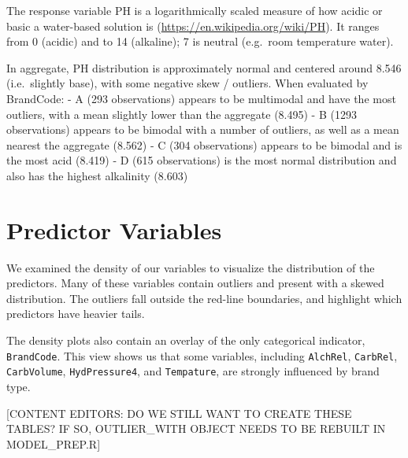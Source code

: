 \documentclass[]{report}
\begin{document}
The response variable PH is a logarithmically scaled measure of how
acidic or basic a water-based solution is
(\url{https://en.wikipedia.org/wiki/PH}). It ranges from 0 (acidic) and
to 14 (alkaline); 7 is neutral (e.g.~room temperature water).

In aggregate, PH distribution is approximately normal and centered
around 8.546 (i.e.~slightly base), with some negative skew / outliers.
When evaluated by BrandCode: - A (293 observations) appears to be
multimodal and have the most outliers, with a mean slightly lower than
the aggregate (8.495) - B (1293 observations) appears to be bimodal with
a number of outliers, as well as a mean nearest the aggregate (8.562) -
C (304 observations) appears to be bimodal and is the most acid (8.419)
- D (615 observations) is the most normal distribution and also has the
highest alkalinity (8.603)

\hypertarget{predictor-variables}{%
\section{Predictor Variables}\label{predictor-variables}}

We examined the density of our variables to visualize the distribution
of the predictors. Many of these variables contain outliers and present
with a skewed distribution. The outliers fall outside the red-line
boundaries, and highlight which predictors have heavier tails.

The density plots also contain an overlay of the only categorical
indicator, \texttt{BrandCode}. This view shows us that some variables,
including \texttt{AlchRel}, \texttt{CarbRel}, \texttt{CarbVolume},
\texttt{HydPressure4}, and \texttt{Tempature}, are strongly influenced
by brand type.

{[}CONTENT EDITORS: DO WE STILL WANT TO CREATE THESE TABLES? IF SO,
OUTLIER\_WITH OBJECT NEEDS TO BE REBUILT IN MODEL\_PREP.R{]}
\end{document}
